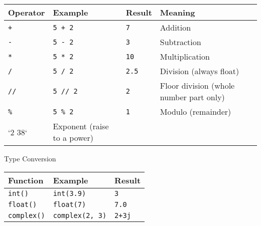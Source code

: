 \documentclass[
  letterpaper,
  DIV=11,
  numbers=noendperiod]{scrreprt}
\begin{document}
\begin{longtable}[]{@{}
  >{\raggedright\arraybackslash}p{}
  >{\raggedright\arraybackslash}p{}
  >{\raggedright\arraybackslash}p{}
  >{\raggedright\arraybackslash}p{}@{}}
\toprule\noalign{}
\begin{minipage}[b]{\linewidth}\raggedright
Operator
\end{minipage} & \begin{minipage}[b]{\linewidth}\raggedright
Example
\end{minipage} & \begin{minipage}[b]{\linewidth}\raggedright
Result
\end{minipage} & \begin{minipage}[b]{\linewidth}\raggedright
Meaning
\end{minipage} \\
\midrule\noalign{}
\endhead
\bottomrule\noalign{}
\endlastfoot
\texttt{+} & \texttt{5\ +\ 2} & \texttt{7} & Addition \\
\texttt{-} & \texttt{5\ -\ 2} & \texttt{3} & Subtraction \\
\texttt{*} & \texttt{5\ *\ 2} & \texttt{10} & Multiplication \\
\texttt{/} & \texttt{5\ /\ 2} & \texttt{2.5} & Division (always
float) \\
\texttt{//} & \texttt{5\ //\ 2} & \texttt{2} & Floor division (whole
number part only) \\
\texttt{\%} & \texttt{5\ \%\ 2} & \texttt{1} & Modulo (remainder) \\
`\texttt{\textbar{}}2 3\texttt{\textbar{}}8` & Exponent (raise to a
power) & & \\
\end{longtable}

Type Conversion

\begin{longtable}[]{@{}lll@{}}
\toprule\noalign{}
Function & Example & Result \\
\midrule\noalign{}
\endhead
\bottomrule\noalign{}
\endlastfoot
\texttt{int()} & \texttt{int(3.9)} & \texttt{3} \\
\texttt{float()} & \texttt{float(7)} & \texttt{7.0} \\
\texttt{complex()} & \texttt{complex(2,\ 3)} & \texttt{2+3j} \\
\end{longtable}
\end{document}
